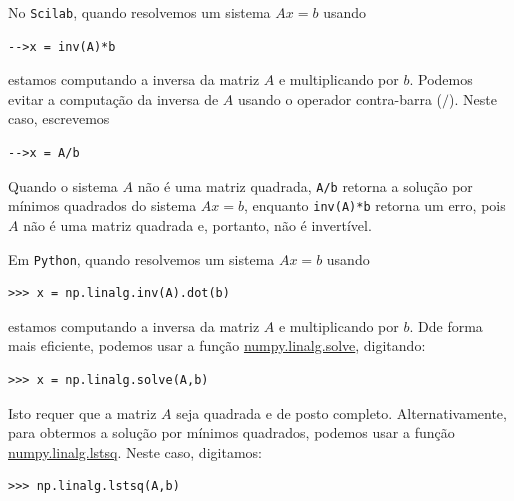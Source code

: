 \ifisscilab
\begin{obs}
  No \verb+Scilab+, quando resolvemos um sistema $Ax = b$ usando
\begin{verbatim}
-->x = inv(A)*b
\end{verbatim}
estamos computando a inversa da matriz $A$ e multiplicando por $b$. Podemos evitar a computação da inversa de $A$ usando o operador contra-barra ($/$). Neste caso, escrevemos
\begin{verbatim}
-->x = A/b
\end{verbatim}
Quando o sistema $A$ não é uma matriz quadrada, \verb+A/b+ retorna a solução por mínimos quadrados do sistema $Ax = b$, enquanto \verb+inv(A)*b+ retorna um erro, pois $A$ não é uma matriz quadrada e, portanto, não é invertível.
\end{obs}
\fi
\ifisscilab
\begin{obs}
  Em \verb+Python+, quando resolvemos um sistema $Ax = b$ usando
\begin{verbatim}
>>> x = np.linalg.inv(A).dot(b)
\end{verbatim}
estamos computando a inversa da matriz $A$ e multiplicando por $b$. Dde forma mais eficiente, podemos usar a função \href{https://docs.scipy.org/doc/numpy/reference/generated/numpy.linalg.solve.html}{numpy.linalg.solve}, digitando:
\begin{verbatim}
>>> x = np.linalg.solve(A,b)
\end{verbatim}
Isto requer que a matriz $A$ seja quadrada e de posto completo. Alternativamente, para obtermos a solução por mínimos quadrados, podemos usar a função \href{https://docs.scipy.org/doc/numpy/reference/generated/numpy.linalg.lstsq.html}{numpy.linalg.lstsq}. Neste caso, digitamos:
\begin{verbatim}
>>> np.linalg.lstsq(A,b)
\end{verbatim}
\end{obs}
\fi





